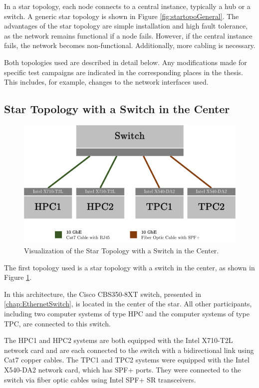 In a star topology, each node connects to a central instance, typically a hub or a switch. A generic star topology is shown in Figure \ref{fig:startopoGeneral}. The advantages of the star topology are simple installation and high fault tolerance, as the network remains functional if a node fails. However, if the central instance fails, the network becomes non-functional. Additionally, more cabling is necessary.

Both topologies used are described in detail below. Any modifications made for specific test campaigns are indicated in the corresponding places in the thesis. This includes, for example, changes to the network interfaces used.

\subsection{Star Topology with a Switch in the Center} \label{chap:TopoSwitch}

\begin{figure}[h]
    \centering
    \includegraphics[width=1\linewidth]{figures/method/topo2.pdf}
    \caption[Visualization of the Star Topology with a Switch in the Center]{Visualization of the Star Topology with a Switch in the Center.}
    \label{fig:startopoSwitch}
\end{figure}

The first topology used is a star topology with a switch in the center, as shown in Figure \ref{fig:startopoSwitch}.

In this architecture, the Cisco CBS350-8XT switch, presented in \ref{chap:EthernetSwitch}, is located in the center of the star. All other participants, including two computer systems of type HPC and the computer systems of type TPC, are connected to this switch.

The HPC1 and HPC2 systems are both equipped with the Intel X710-T2L network card and are each connected to the switch with a bidirectional link using Cat7 copper cables. The TPC1 and TPC2 systems were equipped with the Intel X540-DA2 network card, which has SPF+ ports. They were connected to the switch via fiber optic cables using Intel SPF+ SR transceivers.

